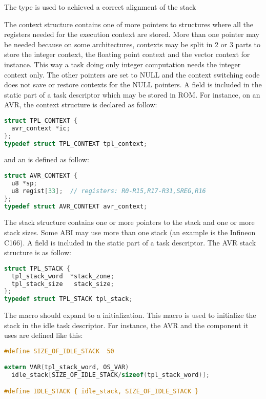 The  type is used to achieved a correct alignment of the stack

The  context structure contains one of more pointers to structures where all the registers needed for the execution context are stored.
More than one pointer may be needed because on some architectures, contexts may be split in 2 or 3 parts to store the integer context, the floating point context and the vector context for instance.
This way a task doing only integer computation needs the integer context only.
The other pointers are set to NULL and the context switching code does not save or restore contexts for the NULL pointers.
A  field is included in the static part of a task descriptor which may be stored in ROM.
For instance, on an AVR, the context structure is declared as follow:

\begin{lstlisting}[language=C]
struct TPL_CONTEXT {
  avr_context *ic;
};
typedef struct TPL_CONTEXT tpl_context;
\end{lstlisting}

and an  is defined as follow:

\begin{lstlisting}[language=C]
struct AVR_CONTEXT {
  u8 *sp;
  u8 regist[33];  // registers: R0-R15,R17-R31,SREG,R16
};
typedef struct AVR_CONTEXT avr_context;
\end{lstlisting}

The  stack structure contains one or more pointers to the stack and one or more stack sizes. Some ABI may use more than one stack (an example is the Infineon C166). A  field is included in the static part of a task descriptor. The AVR stack structure is as follow:

\begin{lstlisting}[language=C]
struct TPL_STACK {
  tpl_stack_word  *stack_zone;
  tpl_stack_size   stack_size; 
};
typedef struct TPL_STACK tpl_stack;
\end{lstlisting}

The  macro should expand to a  initialization. This macro is used to initialize the stack in the idle task descriptor. For instance, the AVR  and the component it uses are defined like this:

\begin{lstlisting}[language=C]
#define SIZE_OF_IDLE_STACK  50

extern VAR(tpl_stack_word, OS_VAR)
  idle_stack[SIZE_OF_IDLE_STACK/sizeof(tpl_stack_word)];

#define IDLE_STACK { idle_stack, SIZE_OF_IDLE_STACK }
\end{lstlisting}

